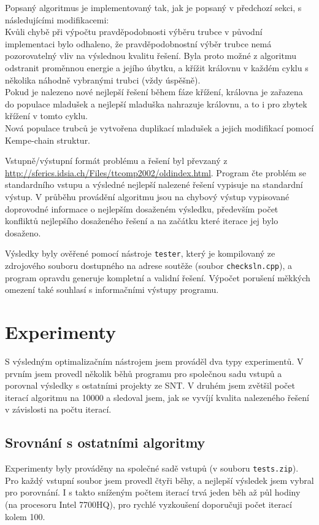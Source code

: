 \documentclass[12pt, a4paper]{article}
\begin{document}
Popsaný algoritmus je implementovaný tak, jak je popsaný v předchozí sekci, s následujícími modifikacemi:\\
Kvůli chybě při výpočtu pravděpodobnosti výběru trubce v původní implementaci bylo odhaleno, že pravděpodobnostní výběr trubce nemá pozorovatelný vliv na výslednou kvalitu řešení.
Byla proto možné z algoritmu odstranit proměnnou energie a jejího úbytku, a křížit královnu v každém cyklu s několika náhodně vybranými trubci (vždy úspěšně).\\
Pokud je nalezeno nové nejlepší řešení během fáze křížení, královna je zařazena do populace mladušek a
nejlepší mladuška nahrazuje královnu, a to i pro zbytek křížení v tomto cyklu.\\
Nová populace trubců je vytvořena duplikací mladušek a jejich modifikací pomocí Kempe-chain struktur.

Vstupně/výstupní formát problému a řešení byl převzaný z \url{http://sferics.idsia.ch/Files/ttcomp2002/oldindex.html}.
Program čte problém se standardního vstupu a výsledné nejlepší nalezené řešení vypisuje na standardní výstup.
V průběhu provádění algoritmu jsou na chybový výstup vypisované doprovodné informace o nejlepším dosaženém výsledku, především
počet konfliktů nejlepšího dosaženého řešení a na začátku které iterace jej bylo dosaženo.

Výsledky byly ověřené pomocí nástroje \texttt{tester}, který je kompilovaný ze zdrojového souboru dostupného
na adrese soutěže (soubor \texttt{checksln.cpp}), a program opravdu generuje kompletní a validní řešení.
Výpočet porušení měkkých omezení také souhlasí s informačními výstupy programu.

\section{Experimenty}
S výsledným optimalizačním nástrojem jsem prováděl dva typy experimentů. V prvním jsem provedl několik běhů programu pro společnou sadu vstupů a porovnal výsledky s ostatními projekty ze SNT.
V druhém jsem zvětšil počet iterací algoritmu na 10000 a sledoval jsem, jak se vyvíjí kvalita nalezeného řešení v závislosti na počtu iterací.

\subsection{Srovnání s ostatními algoritmy}
Experimenty byly prováděny na společné sadě vstupů (v souboru \texttt{tests.zip}). Pro každý vstupní soubor jsem provedl čtyři běhy, a nejlepší výsledek jsem vybral pro porovnání.
I s takto sníženým počtem iterací trvá jeden běh až půl hodiny (na procesoru Intel 7700HQ), pro
rychlé vyzkoušení doporučuji počet iterací kolem 100.
\end{document}
